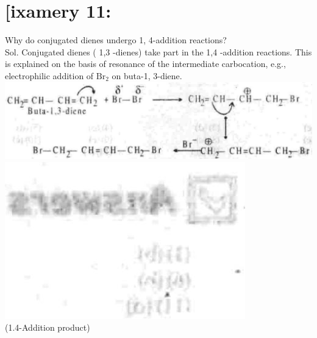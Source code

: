\documentclass[10pt]{article}
\begin{document}
\section*{[ixamery 11:}
Why do conjugated dienes undergo 1, 4-addition reactions?\\
Sol. Conjugated dienes ( 1,3 -dienes) take part in the 1,4 -addition reactions. This is explained on the basis of resonance of the intermediate carbocation, e.g., electrophilic addition of $\mathrm{Br}_{2}$ on buta-1, 3-diene.\\
\includegraphics[max width=\textwidth, center]{2025_01_28_8470952b98110cec3aabg-199(2)}\\
\includegraphics[max width=\textwidth, center]{2025_01_28_8470952b98110cec3aabg-199(4)}\\
(1.4-Addition product)
\end{document}
